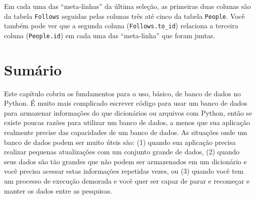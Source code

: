 

Em cada uma das ``meta-linhas'' da última seleção, as primeiras duas colunas
são da tabela {\tt Follows} seguidas pelas colunas três até cinco da tabela
{\tt People}. Você também pode ver que a segunda coluna (\verb"Follows.to_id")
relaciona a terceira coluna ({\tt People.id}) em cada uma das ``meta-linha''
que foram juntas.

\section{Sumário}


Este capítulo cobriu os fundamentos para o uso, básico, de banco de dados no
Python. É muito mais complicado escrever código para usar um banco de dados
para armazenar informações do que dicionários ou arquivos com Python, então
se existe poucas razões para utilizar um banco de dados, a menos que sua
aplicação realmente precise das capacidades de um banco de dados. As situações
onde um banco de dados podem ser muito úteis são: (1) quando sua aplicação
precisa realizar pequenas atualizações com um conjunto grande de dados, (2)
quando seus dados são tão grandes que não podem ser armazenados em um
dicionário e você precisa acessar estas informações repetidas vezes, ou (3)
quando você tem um processo de execução demorada e você quer ser capaz de
parar e recomeçar e manter os dados entre as pesquisas.

